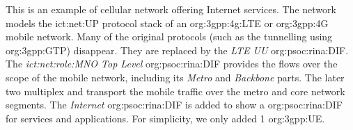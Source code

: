 This is an example of cellular network offering Internet services.
The network models the \ac{ict:net:UP} protocol stack of an \acs{org:3gpp:4g:LTE} or \acs{org:3gpp:4G} mobile network.
Many of the original protocols (such as the tunnelling using \acs{org:3gpp:GTP}) disappear.
They are replaced by the \textit{LTE UU} \ac{org:psoc:rina:DIF}.
The \textit{\acs{ict:net:role:MNO} Top Level} \ac{org:psoc:rina:DIF} provides the flows over the scope of the mobile network, including its \textit{Metro} and \textit{Backbone} parts.
The later two multiplex and transport the mobile traffic over the metro and core network segments.
The \textit{Internet} \ac{org:psoc:rina:DIF} is added to show a \ac{org:psoc:rina:DIF} for services and applications.
For simplicity, we only added 1 \acs{org:3gpp:UE}.

